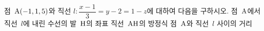 점~$\mathrm{A}(-1{,}\mkern3mu\mathopen{}1{,}\mkern3mu\mathopen{}5)$와 직선 $l\colon \dfrac{x-1}{3}=y-2=1-z$에 대하여 다음을 구하시오.
 점~$\mathrm{A}$에서 직선~$l$에 내린 수선의 발~$\mathrm{H}$의 좌표
 직선~$\mathrm{AH}$의 방정식
 점~$\mathrm{A}$와 직선~$l$ 사이의 거리
